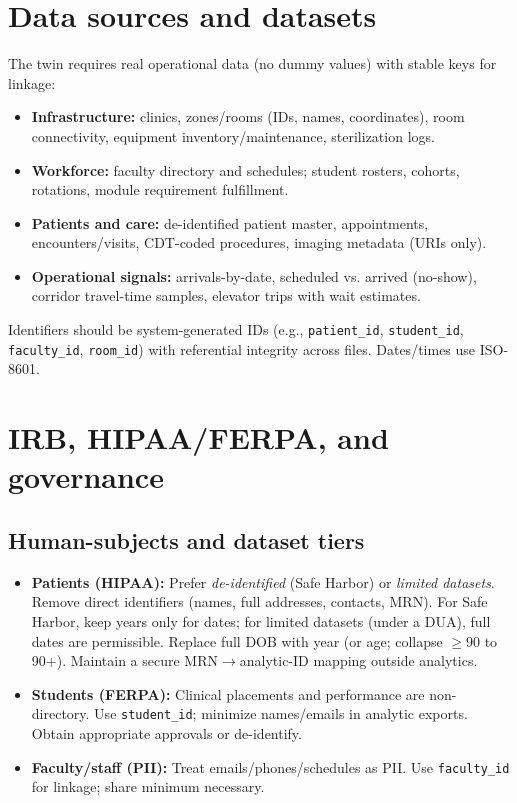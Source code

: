\documentclass[Afour,sageh,times]{sagej}
\begin{document}
\section{Data sources and datasets}
The twin requires real operational data (no dummy values) with stable keys for linkage:
\begin{itemize}[leftmargin=*,itemsep=2pt]
  \item \textbf{Infrastructure:} clinics, zones/rooms (IDs, names, coordinates), room connectivity, equipment inventory/maintenance, sterilization logs.
  \item \textbf{Workforce:} faculty directory and schedules; student rosters, cohorts, rotations, module requirement fulfillment.
  \item \textbf{Patients and care:} de-identified patient master, appointments, encounters/visits, CDT-coded procedures, imaging metadata (URIs only).
  \item \textbf{Operational signals:} arrivals-by-date, scheduled vs. arrived (no-show), corridor travel-time samples, elevator trips with wait estimates.
\end{itemize}
Identifiers should be system-generated IDs (e.g., \texttt{patient\_id}, \texttt{student\_id}, \texttt{faculty\_id}, \texttt{room\_id}) with referential integrity across files. Dates/times use ISO-8601.

\section{IRB, HIPAA/FERPA, and governance}
\subsection{Human-subjects and dataset tiers}
\begin{itemize}[leftmargin=*,itemsep=2pt]
  \item \textbf{Patients (HIPAA):} Prefer \emph{de-identified} (Safe Harbor) or \emph{limited datasets}. Remove direct identifiers (names, full addresses, contacts, MRN). For Safe Harbor, keep years only for dates; for limited datasets (under a DUA), full dates are permissible. Replace full DOB with year (or age; collapse $\ge 90$ to 90+). Maintain a secure MRN$\rightarrow$analytic-ID mapping outside analytics.
  \item \textbf{Students (FERPA):} Clinical placements and performance are non-directory. Use \texttt{student\_id}; minimize names/emails in analytic exports. Obtain appropriate approvals or de-identify.
  \item \textbf{Faculty/staff (PII):} Treat emails/phones/schedules as PII. Use \texttt{faculty\_id} for linkage; share minimum necessary.
\end{itemize}
\end{document}
